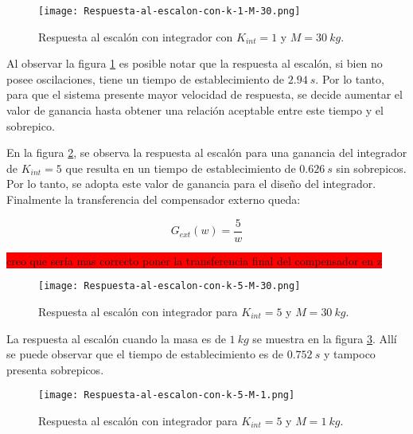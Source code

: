 \begin{figure}[H]
	\centering
	\texttt{[image: Respuesta-al-escalon-con-k-1-M-30.png]}
	\caption{Respuesta al escalón con integrador con $K_{int} =1$ y $M=30\:kg$.}
	\label{fig:respuesta-al-escalon-con-k-1-M-30}
\end{figure}


Al observar la figura \ref{fig:respuesta-al-escalon-con-k-1-M-30} es posible notar que la respuesta al escalón, si bien no posee oscilaciones, tiene un tiempo de establecimiento de  $2.94\:s$. Por lo tanto, para que el sistema presente mayor velocidad de respuesta, se decide aumentar el valor de ganancia hasta obtener una relación aceptable entre este tiempo y el sobrepico.

En la figura \ref{fig:respuesta-al-escalon-con-k-5-M-30}, se observa la respuesta al escalón para una ganancia del integrador de $K_{int}=5$ que resulta en un tiempo de establecimiento de $0.626\:s$ sin sobrepicos. Por lo tanto, se adopta este valor de ganancia para el diseño del integrador. Finalmente la transferencia del compensador externo queda:

\begin{equation} \label{eq_gexterno_dig}
	G_{ext}(w)=\frac{5}{w}	
\end{equation}

\colorbox{red}{creo que sería mas correcto poner la transferencia final del compensador en z}

\begin{figure}[H]
	\centering
	\texttt{[image: Respuesta-al-escalon-con-k-5-M-30.png]}
	\caption{Respuesta al escalón con integrador para $K_{int} =5$ y $M = 30\:kg$.}
	\label{fig:respuesta-al-escalon-con-k-5-M-30}
\end{figure}






 La respuesta al escal\'{o}n cuando la masa es de $1\:kg$ se muestra en la figura \ref{fig:respuesta-al-escalon-con-k-5-M-1}. Allí se puede observar que el tiempo de establecimiento es de $0.752\:s$ y tampoco presenta sobrepicos.



\begin{figure}[H]
	\centering
	\texttt{[image: Respuesta-al-escalon-con-k-5-M-1.png]}
	\caption{Respuesta al escalón con integrador para $K_{int} =5$ y $M=1\:kg$.}
	\label{fig:respuesta-al-escalon-con-k-5-M-1}
\end{figure}


